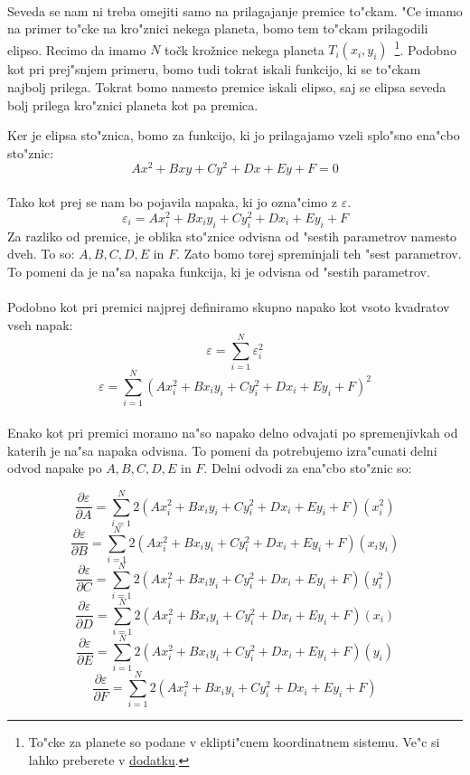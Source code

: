 \paragraph{}
Seveda se nam ni treba omejiti samo na prilagajanje premice to"ckam. "Ce imamo na primer to"cke na kro"znici nekega planeta, bomo tem to"ckam prilagodili elipso. Recimo da imamo $N$ točk krožnice nekega planeta $T_i(x_i, y_i)$~\footnote{To"cke za planete so podane v eklipti"cnem koordinatnem sistemu. Ve"c si lahko preberete v \hyperref[eklipticni_sistem]{dodatku}.}. Podobno kot pri prej"snjem primeru, bomo tudi tokrat iskali funkcijo, ki se to"ckam najbolj prilega. Tokrat bomo namesto premice iskali elipso, saj se elipsa seveda bolj prilega kro"znici planeta kot pa premica.

Ker je elipsa sto"znica, bomo za funkcijo, ki jo prilagajamo vzeli splo"sno ena"cbo sto"znic:
$$Ax^2 + Bxy + Cy^2 + Dx + Ey + F = 0$$

\paragraph{}
Tako kot prej se nam bo pojavila napaka, ki jo ozna"cimo z $\varepsilon$.
$$\varepsilon_i = Ax_i^2 + Bx_iy_i + Cy_i^2 + Dx_i + Ey_i + F$$
Za razliko od premice, je oblika sto"znice odvisna od "sestih parametrov namesto dveh. To so: $A, B, C, D, E$ in $F$. Zato bomo torej spreminjali teh "sest parametrov. To pomeni da je na"sa napaka funkcija, ki je odvisna od "sestih parametrov.

\paragraph{}
Podobno kot pri premici najprej definiramo skupno napako kot vsoto kvadratov vseh napak:
\[\varepsilon = \sum_{i=1}^{N}\varepsilon_i^2\]
\[\varepsilon = \sum_{i=1}^{N} (Ax_i^2 + Bx_iy_i + Cy_i^2 + Dx_i + Ey_i + F)^2\]

\paragraph{}
Enako kot pri premici moramo na"so napako delno odvajati po spremenjivkah od katerih je na"sa napaka odvisna. To pomeni da potrebujemo izra"cunati delni odvod napake po $A, B, C, D, E$ in $F$. Delni odvodi za ena"cbo sto"znic so:

$$\frac{\partial \varepsilon}{\partial A} = \sum_{i=1}^{N}2(Ax_i^2 + Bx_iy_i + Cy_i^2 + Dx_i + Ey_i + F)(x_i^2)$$
$$\frac{\partial \varepsilon}{\partial B} = \sum_{i=1}^{N}2(Ax_i^2 + Bx_iy_i + Cy_i^2 + Dx_i + Ey_i + F)(x_iy_i)$$
$$\frac{\partial \varepsilon}{\partial C} = \sum_{i=1}^{N}2(Ax_i^2 + Bx_iy_i + Cy_i^2 + Dx_i + Ey_i + F)(y_i^2)$$
$$\frac{\partial \varepsilon}{\partial D} = \sum_{i=1}^{N}2(Ax_i^2 + Bx_iy_i + Cy_i^2 + Dx_i + Ey_i + F)(x_i)$$
$$\frac{\partial \varepsilon}{\partial E} = \sum_{i=1}^{N}2(Ax_i^2 + Bx_iy_i + Cy_i^2 + Dx_i + Ey_i + F)(y_i)$$
$$\frac{\partial \varepsilon}{\partial F} = \sum_{i=1}^{N}2(Ax_i^2 + Bx_iy_i + Cy_i^2 + Dx_i + Ey_i + F)$$

